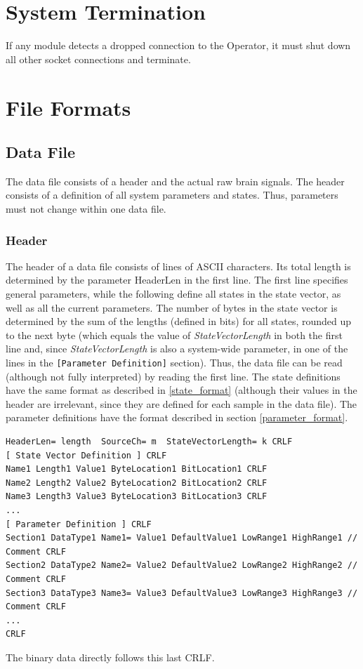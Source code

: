\documentclass[letterpaper,oneside,12pt]{book}
\begin{document}
\section{System Termination}
\label{system_termination}

If any module detects a dropped connection to the Operator, it must shut down 
all other socket connections and terminate.

\section{File Formats}

\subsection{Data File}

The data file consists of a header and the actual raw brain signals. The header 
consists of a definition of all system parameters and states. Thus, parameters 
must not change within one data file.

\subsubsection{Header}

The header of a data file consists of lines of ASCII characters. Its total 
length is determined by the parameter HeaderLen in the first line.
The first line specifies general parameters, while the following define all
states in the state vector, as well as all the current parameters.
The number of bytes in the state vector is determined by the sum of the
lengths (defined in bits) for all states, rounded up to the next byte
(which equals the value of \textit{StateVectorLength} in both the first 
line and, since \textit{StateVectorLength} is also a system-wide parameter,
in one of the lines in the \texttt{[Parameter Definition]} section).
Thus, the data file can be read (although not fully interpreted) by reading
the first line.
The state definitions have the same format as described in \ref{state_format}
(although their values in the header are irrelevant, since they are defined
for each sample in the data file).
The parameter definitions have the format described in section
\ref{parameter_format}.

\begin{flushleft}
\begin{footnotesize}
\begin{verbatim}
HeaderLen= length  SourceCh= m  StateVectorLength= k CRLF
[ State Vector Definition ] CRLF
Name1 Length1 Value1 ByteLocation1 BitLocation1 CRLF
Name2 Length2 Value2 ByteLocation2 BitLocation2 CRLF
Name3 Length3 Value3 ByteLocation3 BitLocation3 CRLF
...
[ Parameter Definition ] CRLF
Section1 DataType1 Name1= Value1 DefaultValue1 LowRange1 HighRange1 // Comment CRLF
Section2 DataType2 Name2= Value2 DefaultValue2 LowRange2 HighRange2 // Comment CRLF
Section3 DataType3 Name3= Value3 DefaultValue3 LowRange3 HighRange3 // Comment CRLF
...
CRLF
\end{verbatim}
\end{footnotesize}
\end{flushleft}
The binary data directly follows this last CRLF.
\end{document}
